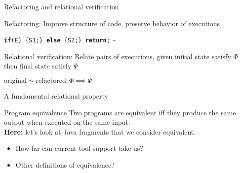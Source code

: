 \begin{frame}{Refactoring and relational verification} 
  \begin{block}{Refactoring:}
  Improve structure of code, preserve behavior of executions
  \begin{center}
    {\scriptsize \texttt{\textbf{if}(E) \{S1;\} \textbf{else} \{S2;\} \textbf{return};}} \quad {}\sim {}
  \end{center}
  \end{block}
  \vspace{5mm}
  \begin{block}{Relational verification:}
  Relate pairs of executions, given initial state satisfy $\Phi$ then final state satisfy $\Psi$
  \begin{center}
  $\text{original} \sim \text{refactored} : \Phi \implies \Psi$ 
  \end{center}
  \end{block}
\end{frame}


\begin{frame}{A fundamental relational property}
\begin{block}{Program equivalence}
  Two programs are equivalent iff they produce the same output when executed on the same input.
\\[2ex]
{\bf Here:} let's look at Java fragments that we consider equivalent.
\end{block}
\vspace{0.5cm}
\begin{itemize}
     \item How far can current tool support take us?
     \item Other definitions of equivalence?
\end{itemize}


\end{frame}


